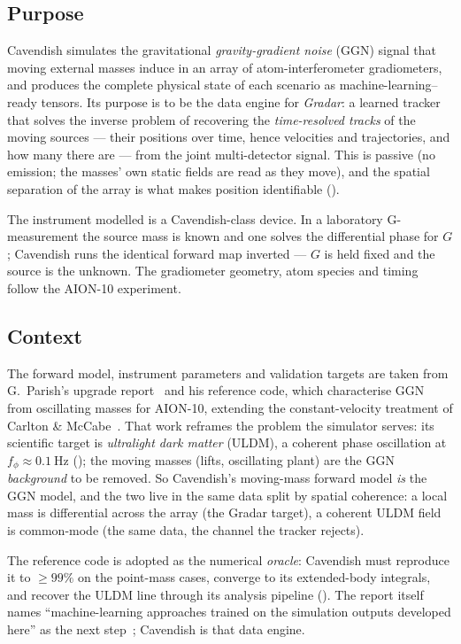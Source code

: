 \documentclass[11pt,a4paper]{article}
\theoremstyle{reqstyle}
\begin{document}
\subsection{Purpose}
Cavendish simulates the gravitational \emph{gravity-gradient noise} (GGN) signal that
moving external masses induce in an array of atom-interferometer gradiometers, and produces
the complete physical state of each scenario as machine-learning--ready tensors. Its purpose
is to be the data engine for \emph{Gradar}: a learned tracker that solves the
inverse problem of recovering the \emph{time-resolved tracks} of the moving sources --- their
positions over time, hence velocities and trajectories, and how many there are --- from the
joint multi-detector signal. This is passive (no emission; the masses' own static fields are
read as they move), and the spatial separation of the array is what makes position
identifiable ().

The instrument modelled is a Cavendish-class device. In a laboratory G-measurement the
source mass is known and one solves the differential phase for $G$; Cavendish runs the
identical forward map inverted --- $G$ is held fixed and the source is the unknown. The
gradiometer geometry, atom species and timing follow the AION-10 experiment.

\subsection{Context}
The forward model, instrument parameters and validation targets are taken from
G.~Parish's upgrade report~\cite{parish2026} and his reference code, which characterise GGN
from oscillating masses for AION-10, extending the constant-velocity treatment of Carlton \&
McCabe~\cite{carlton2023}. That work reframes the problem the simulator serves: its
scientific target is \emph{ultralight dark matter} (ULDM), a coherent phase oscillation at
$f_\phi \approx \SI{0.1}{\hertz}$ (); the moving masses (lifts, oscillating
plant) are the GGN \emph{background} to be removed. So Cavendish's moving-mass forward model
\emph{is} the GGN model, and the two live in the same data split by spatial coherence: a
local mass is differential across the array (the Gradar target), a coherent ULDM field is
common-mode (the same data, the channel the tracker rejects).

The reference code is adopted as the numerical \emph{oracle}: Cavendish must reproduce it to
$\geq 99\%$ on the point-mass cases, converge to its extended-body integrals, and recover the
ULDM line through its analysis pipeline (). The report itself names
``machine-learning approaches trained on the simulation outputs developed here'' as the next
step~\cite{parish2026}; Cavendish is that data engine.
\end{document}
